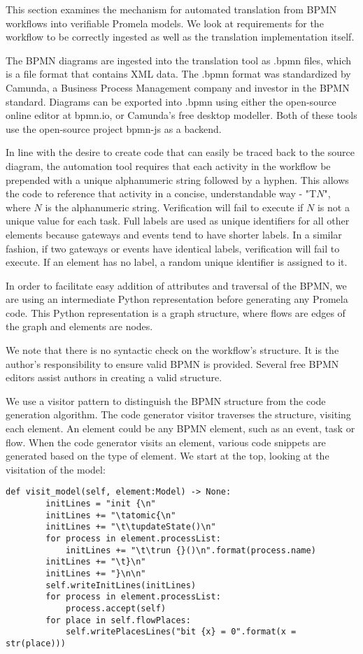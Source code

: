 This section examines the mechanism for automated translation from BPMN workflows into verifiable Promela models. We look at requirements for the workflow to be correctly ingested as well as the translation implementation itself.

The BPMN diagrams are ingested into the translation tool as .bpmn files, which is a file format that contains XML data. The .bpmn format was standardized by Camunda, a Business Process Management company and investor in the BPMN standard. Diagrams can be exported into .bpmn using either the open-source online editor at bpmn.io, or Camunda's free desktop modeller. Both of these tools use the open-source project bpmn-js as a backend.

In line with the desire to create code that can easily be traced back to the source diagram, the automation tool requires that each activity in the workflow be prepended with a unique alphanumeric string followed by a hyphen. This allows the code to reference that activity in a concise, understandable way - "T$N$", where $N$ is the alphanumeric string. Verification will fail to execute if $N$ is not a unique value for each task. Full labels are used as unique identifiers for all other elements because gateways and events tend to have shorter labels. In a similar fashion, if two gateways or events have identical labels, verification will fail to execute. If an element has no label, a random unique identifier is assigned to it.

In order to facilitate easy addition of attributes and traversal of the BPMN, we are using an intermediate Python representation before generating any Promela code. This Python representation is a graph structure, where flows are edges of the graph and elements are nodes.

We note that there is no syntactic check on the workflow's structure. It is the author's responsibility to ensure valid BPMN is provided. Several free BPMN editors assist authors in creating a valid structure. 

We use a visitor pattern to distinguish the BPMN structure from the code generation algorithm. The code generator visitor traverses the structure, visiting each element. An element could be any BPMN element, such as an event, task or flow. When the code generator visits an element, various code snippets are generated based on the type of element. We start at the top, looking at the visitation of the model:
\begin{lstlisting}[style=myPython]
    def visit_model(self, element:Model) -> None:
        initLines = "init {\n"
        initLines += "\tatomic{\n"
        initLines += "\t\tupdateState()\n"
        for process in element.processList:
            initLines += "\t\trun {}()\n".format(process.name)
        initLines += "\t}\n"
        initLines += "}\n\n"
        self.writeInitLines(initLines)
        for process in element.processList:
            process.accept(self)
        for place in self.flowPlaces:
            self.writePlacesLines("bit {x} = 0".format(x = str(place)))
\end{lstlisting}

